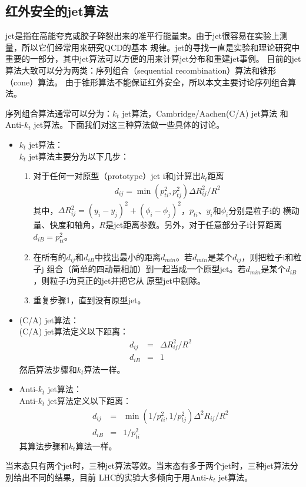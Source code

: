 \subsection{红外安全的jet算法}
jet是指在高能夸克或胶子碎裂出来的准平行能量束。由于jet很容易在实验上测量，所以它们经常用来研究QCD的基本
规律。jet的寻找一直是实验和理论研究中重要的一部分，其中jet算法可以方便的用来计算jet分布和重建jet事例。
目前的jet算法大致可以分为两类\cite{fastjet}：序列组合（sequential recombination）算法和锥形（cone）算法。
由于锥形算法不能保证红外安全，所以本文主要讨论序列组合算法。

序列组合算法通常可以分为：$k_t$ jet算法\cite{ktjet:1,ktjet:2}，Cambridge/Aachen(C/A) jet算法\cite{cajet}
和Anti-$k_t$ jet算法\cite{antiktjet}。下面我们对这三种算法做一些具体的讨论。
\begin{itemize}
\item $k_t$ jet算法：\\
$k_t$ jet算法主要分为以下几步：
\begin{enumerate}
\item 对于任何一对原型（prototype）jet i和j计算出$k_t$距离
\begin{eqnarray}
d_{ij} =  \min(p^2_{ti}, p^2_{tj})\Delta R^2_{ij}/R^2
\end{eqnarray}
其中，$\Delta R^2_{ij} = (y_i - y_j)^2 + (\phi_i-\phi_j)^2$，$p_{ti}$、$y_i$和$\phi_i$分别是粒子i的
横动量、快度和轴角，$R$是jet距离参数。另外，对于任意部分子i计算距离$d_{iB} = p^2_{ti}$。
\item 在所有的$d_{ij}$和$d_{iB}$中找出最小的距离$d_{min}$。若$d_{min}$是某个$d_{ij}$，则把粒子i和粒子j
组合（简单的四动量相加）到一起当成一个原型jet。若$d_{min}$是某个$d_{iB}$，则粒子i为真正的jet并把它从
原型jet中剔除。
\item 重复步骤1，直到没有原型jet。
\end{enumerate}
\item (C/A) jet算法：\\
(C/A) jet算法定义以下距离：
\begin{eqnarray}
d_{ij} &=& \Delta R^2_{ij}/R^2 \\
d_{iB} &=& 1
\end{eqnarray}
然后算法步骤和$k_t$算法一样。
\item Anti-$k_t$ jet算法：\\
Anti-$k_t$ jet算法定义以下距离：
\begin{eqnarray}
d_{ij} &=& \min(1/p^2_{ti}, 1/p^2_{tj})\Delta^2R_{ij}/R^2 \\
d_{iB} &=& 1/p^2_{ti}
\end{eqnarray}
其算法步骤和$k_t$算法一样。
\end{itemize}
当末态只有两个jet时，三种jet算法等效。当末态有多于两个jet时，三种jet算法分别给出不同的结果，目前
LHC的实验大多倾向于用Anti-$k_t$ jet算法。

